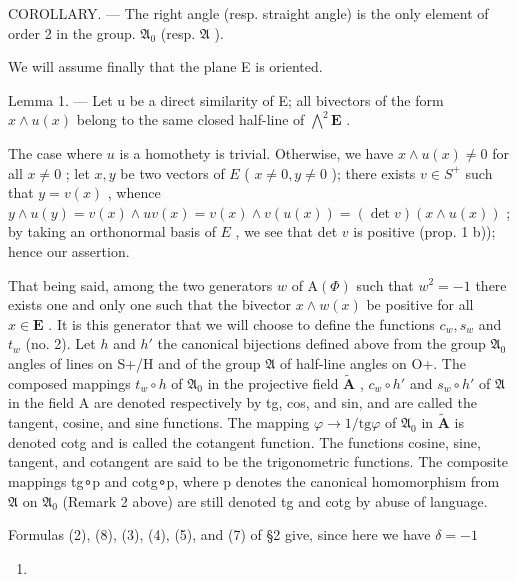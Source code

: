 COROLLARY. --- The right angle (resp. straight angle) is the only element of order 2 in the group. \(\mathfrak{A}_{0}\) (resp. \(\mathfrak{A}\) ).

We will assume finally that the plane E is oriented.

Lemma 1. --- Let u be a direct similarity of E; all bivectors of the form \(x \wedge u(x)\) belong to the same closed half-line of \(\bigwedge^{2}\mathbf{E}\) .

The case where \(u\) is a homothety is trivial. Otherwise, we have \(x \wedge u(x) \neq 0\) for all \(x \neq 0\) ; let \(x, y\) be two vectors of \(E\) ( \(x \neq 0, y \neq 0\) ); there exists \(v \in S^+\) such that \(y = v(x)\) , whence \(y \wedge u(y) = v(x) \wedge uv(x) = v(x) \wedge v(u(x)) = (\det v)(x \wedge u(x))\) ; by taking an orthonormal basis of \(E\) , we see that det \(v\) is positive (prop. 1 b)); hence our assertion.

That being said, among the two generators \(w\) of \(\mathrm{A}(\Phi)\) such that \(w^{2} = -1\) there exists one and only one such that the bivector \(x \wedge w(x)\) be positive for all \(x\in\mathbf{E}\) . It is this generator that we will choose to define the functions \(c_{w}, s_{w}\) and \(t_{w}\) (no. 2). Let \(h\) and \(h'\) the canonical bijections defined above from the group \(\mathfrak{A}_{0}\) angles of lines on S+/H and of the group \(\mathfrak{A}\) of half-line angles on O+. The composed mappings \(t_{w}\circ h\) of \(\mathfrak{A}_{0}\) in the projective field \(\tilde{\mathbf{A}}\) , \(c_{w}\circ h'\) and \(s_{w}\circ h'\) of \(\mathfrak{A}\) in the field A are denoted respectively by tg, cos, and sin, and are called the tangent, cosine, and sine functions. The mapping \(\varphi\to1/\mathrm{tg}\varphi\) of \(\mathfrak{A}_{0}\) in \(\tilde{\mathbf{A}}\) is denoted cotg and is called the cotangent function. The functions cosine, sine, tangent, and cotangent are said to be the trigonometric functions. The composite mappings tg∘p and cotg∘p, where p denotes the canonical homomorphism from \(\mathfrak{A}\) on \(\mathfrak{A}_{0}\) (Remark 2 above) are still denoted tg and cotg by abuse of language.

Formulas (2), (8), (3), (4), (5), and (7) of §2 give, since here we have \(\delta = -1\)

\begin{enumerate}
\def\labelenumi{(\arabic{enumi})}
\setcounter{enumi}{10}
\tightlist
\item
\end{enumerate}


